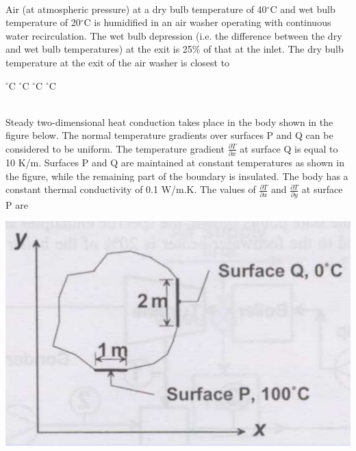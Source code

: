 \documentclass[addpoints,11pt]{exam}
\begin{document}
\begin{questions}
        \begin{oneparchoices}
        \end{oneparchoices}\\

        \question Air (at atmospheric pressure) at a dry bulb temperature of 40$^\circ$C and wet bulb temperature of 20$^\circ$C is humidified in an air washer operating with continuous water recirculation. The wet bulb depression (i.e. the difference between the dry and wet bulb temperatures) at the exit is 25\% of that at the inlet. The dry bulb temperature at the exit of the air washer is closest to\\

        \begin{oneparchoices}
            $^\circ$C
            $^\circ$C
            $^\circ$C
            $^\circ$C
        \end{oneparchoices}\\

        \question Steady two-dimensional heat conduction takes place in the body shown in the figure below. The normal temperature gradients over surfaces P and Q can be considered to be uniform. The temperature gradient $\frac{\partial{T}}{\partial{x}}$ at surface Q is equal to 10 K/m. Surfaces P and Q are maintained at constant temperatures as shown in the figure, while the remaining part of the boundary is insulated. The body has a constant thermal conductivity of 0.1 W/m.K. The values of $\frac{\partial{T}}{\partial{x}}$ and $\frac{\partial{T}}{\partial{y}}$ at surface P are
        
        \begin{center}
            \includegraphics[scale=0.3]{q56}
        \end{center}


\end{questions}
\end{document}

